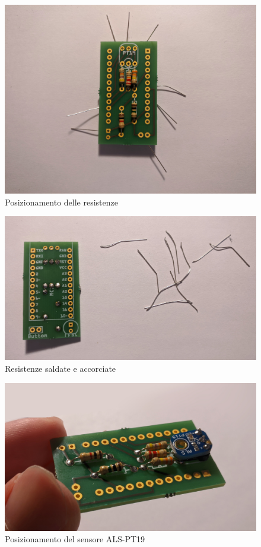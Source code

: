\begin{figure}[H]
	\centering
	\includegraphics[width=\textwidth]{Dispositivo_files/assembly_04.jpg}
	\caption{Posizionamento delle resistenze}
	\label{fig:assembly_04}
\end{figure}

\begin{figure}[H]
	\centering
	\includegraphics[width=\textwidth]{Dispositivo_files/assembly_05.jpg}
	\caption{Resistenze saldate e accorciate}
	\label{fig:assembly_05}
\end{figure}

\begin{figure}[H]
	\centering
	\includegraphics[width=\textwidth]{Dispositivo_files/assembly_06.jpg}
	\caption{Posizionamento del sensore ALS-PT19}
	\label{fig:assembly_06}
\end{figure}

